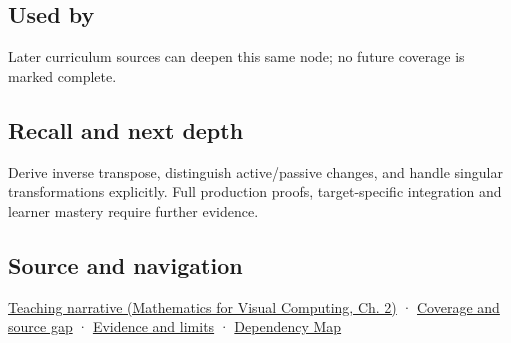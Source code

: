 \subsection{Used by}\label{appendix-46da295c6787-used-by}

Later curriculum sources can deepen this same node; no future coverage is marked complete.

\subsection{Recall and next depth}\label{appendix-46da295c6787-recall-and-next-depth}

Derive inverse transpose, distinguish active/passive changes, and handle singular transformations explicitly. Full production proofs, target-specific integration and learner mastery require further evidence.

\subsection{Source and navigation}\label{appendix-46da295c6787-source-and-navigation}

\href{../02-Mathematics-for-Visual-Computing/main.pdf\#nameddest=01-foundations-i-ch018-a-normal-is-a-measuring-rule-before-it-is-an-arrow}{Teaching narrative (Mathematics for Visual Computing, Ch. 2)} · \hyperref[appendix-fd090d982a15-phase-6---parts-501-600]{Coverage and source gap} · \hyperref[appendix-a103e7846d21-phase-6---source-analysis-and-verification]{Evidence and limits} · \hyperref[appendix-4ad47bdd269a]{Dependency Map}
